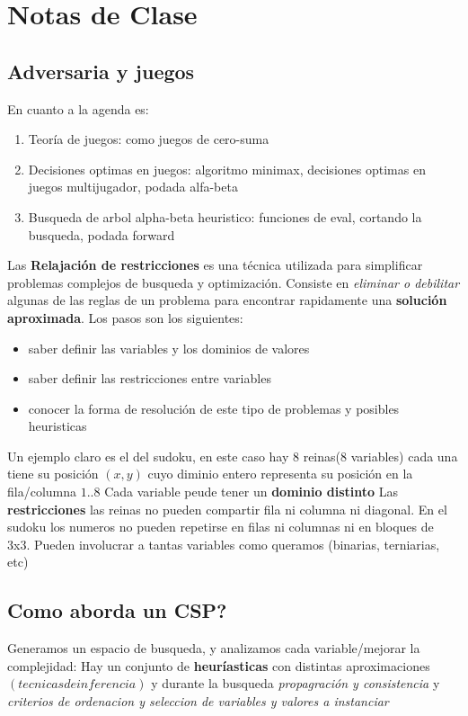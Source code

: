 \section{Notas de Clase}

\subsection{Adversaria y juegos}

En cuanto a la agenda es:
\begin{enumerate}
    \item Teoría de juegos: como juegos de cero-suma
    \item Decisiones optimas en juegos: algoritmo minimax, decisiones optimas en juegos multijugador, podada alfa-beta
    \item Busqueda de arbol alpha-beta heuristico: funciones de eval, cortando la busqueda, podada forward
\end{enumerate}

Las \textbf{Relajación de restricciones} es una técnica utilizada para simplificar problemas complejos de busqueda y optimización. Consiste en \textit{eliminar o debilitar} algunas de las reglas de un problema para encontrar rapidamente una \textbf{solución aproximada}.
Los pasos son los siguientes:
\begin{itemize}
    \item saber definir las variables y los dominios de valores
    \item saber definir las restricciones entre variables
    \item conocer la forma de resolución de este tipo de problemas y posibles heuristicas
\end{itemize}

Un ejemplo claro es el del sudoku, en este caso hay 8 reinas(8 variables) cada una tiene su posición $(x,y)$ cuyo diminio entero representa su posición en la fila/columna $1..8$
Cada variable peude tener un \textbf{dominio distinto}
Las \textbf{restricciones} las reinas no pueden compartir fila ni columna ni diagonal. En el sudoku los numeros no pueden repetirse en filas ni columnas ni en bloques de 3x3.
Pueden involucrar a tantas variables como queramos (binarias, terniarias, etc)

\subsection{Como aborda un CSP?}
Generamos un espacio de busqueda, y analizamos cada variable/mejorar la complejidad:
Hay un conjunto de \textbf{heuríasticas} con distintas aproximaciones $(tecnicas de inferencia)$ y durante la busqueda \textit{propagración y consistencia} y \textit{criterios de ordenacion y seleccion de variables y valores a instanciar}

